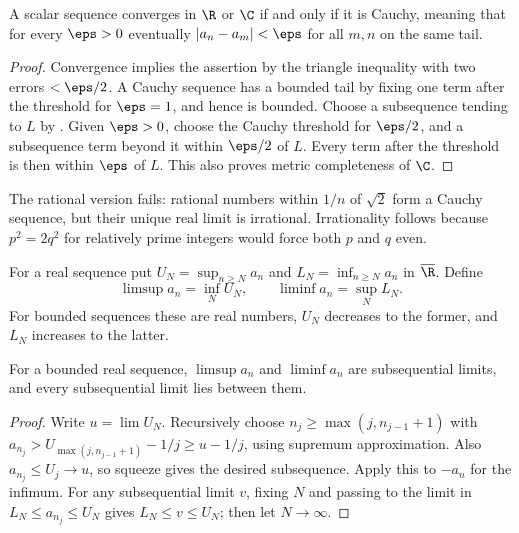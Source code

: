 \begin{theorem}
A scalar sequence converges in $\R$ or $\C$ if and only if it is Cauchy, meaning that for every $\eps>0$ eventually $|a_n-a_m|<\eps$ for all $m,n$ on the same tail.
\end{theorem}
\begin{proof}
Convergence implies the assertion by the triangle inequality with two errors $<\eps/2$. A Cauchy sequence has a bounded tail by fixing one term after the threshold for $\eps=1$, and hence is bounded. Choose a subsequence tending to $L$ by . Given $\eps>0$, choose the Cauchy threshold for $\eps/2$, and a subsequence term beyond it within $\eps/2$ of $L$. Every term after the threshold is then within $\eps$ of $L$. This also proves metric completeness of $\C$.
\end{proof}
The rational version fails: rational numbers within $1/n$ of $\sqrt2$ form a Cauchy sequence, but their unique real limit is irrational. Irrationality follows because $p^2=2q^2$ for relatively prime integers would force both $p$ and $q$ even.

\begin{definition}
For a real sequence put $U_N=\sup_{n\ge N}a_n$ and $L_N=\inf_{n\ge N}a_n$ in $\overline\R$. Define
\[ \limsup a_n=\inf_N U_N,\qquad \liminf a_n=\sup_N L_N. \]
For bounded sequences these are real numbers, $U_N$ decreases to the former, and $L_N$ increases to the latter.
\end{definition}
\begin{proposition}
For a bounded real sequence, $\limsup a_n$ and $\liminf a_n$ are subsequential limits, and every subsequential limit lies between them.
\end{proposition}
\begin{proof}
Write $u=\lim U_N$. Recursively choose $n_j\ge\max(j,n_{j-1}+1)$ with $a_{n_j}>U_{\max(j,n_{j-1}+1)}-1/j\ge u-1/j$, using supremum approximation. Also $a_{n_j}\le U_j\to u$, so squeeze gives the desired subsequence. Apply this to $-a_n$ for the infimum. For any subsequential limit $v$, fixing $N$ and passing to the limit in $L_N\le a_{n_j}\le U_N$ gives $L_N\le v\le U_N$; then let $N\to\infty$.
\end{proof}

